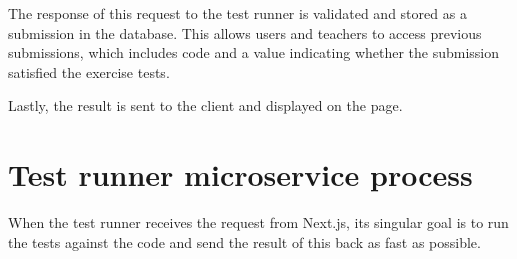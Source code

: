 The response of this request to the test runner is validated and stored as a submission in the database. 
This allows users and teachers to access previous submissions, which includes code and a value indicating whether the submission satisfied the exercise tests.

Lastly, the result is sent to the client and displayed on the page.


\section{Test runner microservice process} \label{sec:test_runner_process}
When the test runner receives the request from Next.js, its singular goal is to run the tests against the code and send the result of this back as fast as possible.






